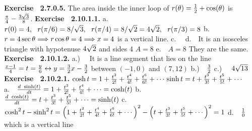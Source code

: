  {\noindent \protect \bf  Exercise ~2.7.0.5.} The area inside the inner loop of $r(\theta )=\protect \frac  {1}{2}+\protect \qopname  \relax o{cos}(\theta )$ is $\protect \frac  {\pi }{4}-\protect \frac  {3\protect \sqrt  {3}}{8}$. \protect \newline  \protect \newline  
 {\noindent \protect \bf  Exercise ~2.10.1.1.} a.~~ $r(0) = 4,~~r(\pi /6) = 8/\protect \sqrt  {3},~~r(\pi /4) =8/\protect \sqrt  {2}=4\protect \sqrt  {2},~~r(\pi /3)= 8 $ b.~~ $r=4\protect \qopname  \relax o{sec}{\theta } \DOTSB \protect \Relbar \protect \joinrel \Rightarrow r \protect \qopname  \relax o{cos}{\theta } = 4 \DOTSB \protect \Relbar \protect \joinrel \Rightarrow x=4$ is a vertical line. c.~~ d.~~It is an isosceles triangle with hypotenuse $4\protect \sqrt  {2}$ and sides 4 $A=8$ e.~~$A=8$ They are the same.  \protect \newline  \protect \newline  
 {\noindent \protect \bf  Exercise ~2.10.1.2.} a.)~~ It is a line segment that lies on the line $\protect \frac  {x-1}{4} = t = \protect \frac  {y}{6} \leftrightarrow y = \protect \frac  {3}{2} x - \protect \frac  {3}{2} $ between $(-1,0)$ and $(7,12)$ \protect \newline  b.)~~$\protect \frac  {3}{2}$ \protect \newline  c.)~~ $4\protect \sqrt  {13}$ \protect \newline  \protect \newline  
 {\noindent \protect \bf  Exercise ~2.10.2.1.} $\protect \qopname  \relax o{cosh}{t} = 1+\protect \frac  {t^2}{2!} + \protect \frac  {t^4}{4!}+\protect \frac  {t^6}{6!} + \protect \cdots  $\protect \newline  $\protect \qopname  \relax o{sinh}{t} = t + \protect \frac  {t^3}{3!} + \protect \frac  {t^5}{5!}+ \protect \cdots  $ \protect \newline  a.~~$\protect \frac  {d ~\protect \qopname  \relax o{sinh}(t)}{dt} = 1+\protect \frac  {t^2}{2!}+\protect \frac  {t^4}{4!} + \protect \cdots  =\protect \qopname  \relax o{cosh}(t)$ \protect \newline  b.~~$\protect \frac  {d ~\protect \qopname  \relax o{cosh}(t)}{dt} = t+\protect \frac  {t^3}{3!}+\protect \frac  {t^5}{5!} + \protect \cdots  =\protect \qopname  \relax o{sinh}(t)$ \protect \newline  c.~~$ \protect \qopname  \relax o{cosh}^2{t}- \protect \qopname  \relax o{sinh}^2{t} = \left (1+\protect \frac  {t^2}{2!} + \protect \frac  {t^4}{4!}+\protect \frac  {t^6}{6!} + \protect \cdots  \right )^2 - \left (t + \protect \frac  {t^3}{3!} + \protect \frac  {t^5}{5!}+ \protect \cdots  \right )^2 = 1 $ \protect \newline  d.~~$\protect \frac  {1}{0}$ which is a vertical line \protect \newline  \protect \newline  

